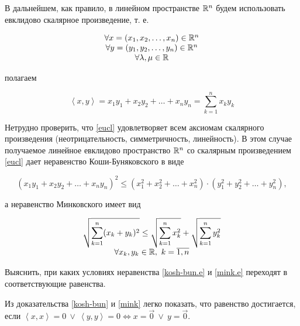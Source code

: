 \documentclass[../../main.tex]{subfiles}
\begin{document}
\begin{rem}
 В дальнейшем, как правило, в линейном пространстве $\mathbb{R}^n$ будем 
 использовать евклидово скалярное произведение, т. е.

 \[
 \begin{array}{c}
  \forall x = (x_1, x_2, \dots, x_n) \in \mathbb{R}^n \\
  \forall y = (y_1, y_2, \dots, y_n) \in \mathbb{R}^n \\
  \forall \lambda, \mu \in \mathbb{R}
 \end{array}
 \]
 
 полагаем
 
 \begin{equation}
  \label{eucl}
  \left<x, y\right> = x_1y_1 + x_2y_2 + \dots + x_ny_n =
  \sum_{k=1}^n x_ky_k
 \end{equation}

 Нетрудно проверить, что \eqref{eucl} удовлетворяет всем аксиомам 
 скалярного произведения (неотрицательность, симметричность, 
 линейность). В этом случае получаемое линейное евклидово пространство
 $\mathbb{R}^n$ со скалярным произведением \eqref{eucl} дает неравенство
 Коши-Буняковского в виде
 
 \begin{equation}
  \label{kosh-bun.e}
  \left(x_1y_1 + x_2y_2 + \dots + x_ny_n\right)^2 \le
  \left(x_1^2 + x_2^2 + \dots + x_n^2\right)\cdot
  \left(y_1^2 + y_2^2 + \dots + y_n^2\right),
 \end{equation}
 
 а неравенство Минковского имеет вид
 
 \begin{equation}
  \label{mink.e}
  \begin{array}{c}
   \displaystyle
   \sqrt{\sum_{k=1}^n (x_k + y_k)^2} \le
   \sqrt{\sum_{k=1}^n x_k^2} + \sqrt{\sum_{k=1}^n y_k^2} \\
   \forall x_k, y_k \in \mathbb{R},\ k = \overline{1, n}
  \end{array}
 \end{equation}
 
\end{rem}

\begin{exc}
 Выяснить, при каких условиях неравенства \eqref{kosh-bun.e} и 
 \eqref{mink.e} переходят в соответствующие равенства.
\end{exc}

\begin{eans}
 Из доказательства \eqref{kosh-bun} и \eqref{mink} легко показать, что 
 равенство достигается, если $\left<x, x\right> = 0\ \lor\ \left<y, 
 y\right> = 0 \iff x = \vec 0\ \lor\ y = \vec 0$.
\end{eans}
\end{document}
